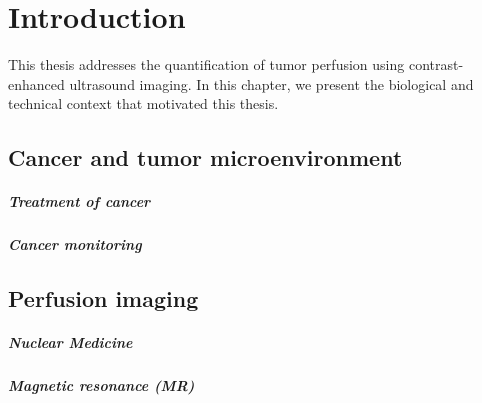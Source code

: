 \chapter{Introduction}\label{chapter:intro}
This thesis addresses the quantification of tumor perfusion using contrast-enhanced ultrasound imaging.
In this chapter, we present the biological and technical context that motivated this thesis.

\section{Cancer and tumor microenvironment}

\paragraph{Treatment of cancer}

\paragraph{Cancer monitoring}

\section{Perfusion imaging}
\label{sec:IntroPerfusionImaging}

\paragraph{Nuclear Medicine}
\label{sec:IntroNM}

\paragraph{Magnetic resonance (MR)}
\label{sec:IntroMR}

